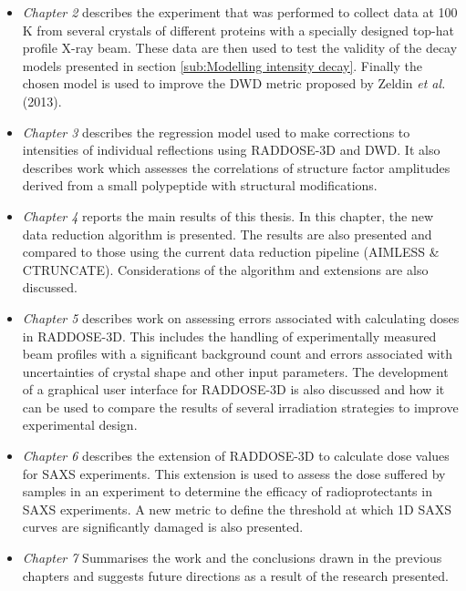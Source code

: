 	\begin{itemize}
        \item \textit{Chapter 2} describes the experiment that was performed to collect data at 100\,K from several crystals of different proteins with a specially designed top-hat profile X-ray beam.
		These data are then used to test the validity of the decay models presented in section \ref{sub:Modelling intensity decay}.
		Finally the chosen model is used to improve the DWD metric proposed by Zeldin \textit{et al.} (2013).
		\item \textit{Chapter 3} describes the regression model used to make corrections to intensities of individual reflections using RADDOSE-3D and DWD.
		It also describes work which assesses the correlations of structure factor amplitudes derived from a small polypeptide with structural modifications.
		\item \textit{Chapter 4} reports the main results of this thesis. In this chapter, the new data reduction algorithm is presented.
		The results are also presented and compared to those using the current data reduction pipeline (AIMLESS \& CTRUNCATE).
		Considerations of the algorithm and extensions are also discussed.
		\item \textit{Chapter 5} describes work on assessing errors associated with calculating doses in RADDOSE-3D.
		This includes the handling of experimentally measured beam profiles with a significant background count and errors associated with uncertainties of crystal shape and other input parameters.
		The development of a graphical user interface for RADDOSE-3D is also discussed and how it can be used to compare the results of several irradiation strategies to improve experimental design.
		\item \textit{Chapter 6} describes the extension of RADDOSE-3D to calculate dose values for SAXS experiments.
		This extension is used to assess the dose suffered by samples in an experiment to determine the efficacy of radioprotectants in SAXS experiments.
		A new metric to define the threshold at which 1D SAXS curves are significantly damaged is also presented.
		\item \textit{Chapter 7} Summarises the work and the conclusions drawn in the previous chapters and suggests future directions as a result of the research presented.
    \end{itemize}
